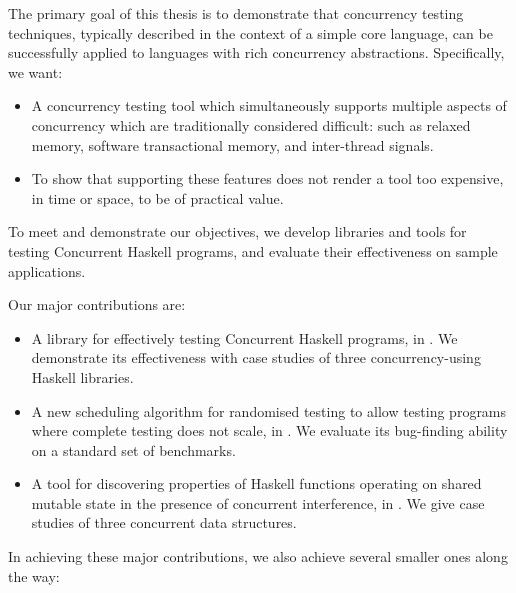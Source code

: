 The primary goal of this thesis is to demonstrate that concurrency
testing techniques, typically described in the context of a simple
core language, can be successfully applied to languages with rich
concurrency abstractions.  Specifically, we want:

\begin{itemize}
\item A concurrency testing tool which simultaneously supports
  multiple aspects of concurrency which are traditionally considered
  difficult: such as relaxed memory, software transactional memory,
  and inter-thread signals.
\item To show that supporting these features does not render a tool
  too expensive, in time or space, to be of practical value.
\end{itemize}

To meet and demonstrate our objectives, we develop libraries and tools
for testing Concurrent Haskell programs, and evaluate their
effectiveness on sample applications.

Our major contributions are:

\begin{itemize}
\item A library for effectively testing Concurrent Haskell programs,
  in .  We demonstrate its effectiveness with case
  studies of three concurrency-using Haskell libraries.
\item A new scheduling algorithm for randomised testing to allow
  testing programs where complete testing does not scale, in
  .  We evaluate its bug-finding ability on a
  standard set of benchmarks.
\item A tool for discovering properties of Haskell functions operating
  on shared mutable state in the presence of concurrent interference,
  in .  We give case studies of three concurrent data
  structures.
\end{itemize}

In achieving these major contributions, we also achieve several
smaller ones along the way:

